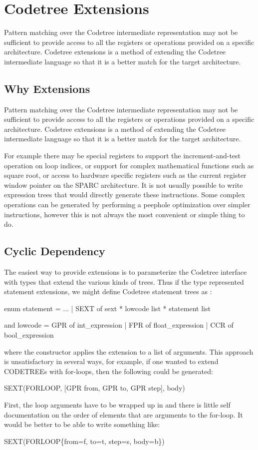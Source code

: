 \section{Codetree Extensions} \label{sec:codetree-extension}
	Pattern matching over the Codetree intermediate representation
may not be sufficient to provide access to all the registers or
operations provided on a specific architecture. Codetree extensions is a 
method of extending the Codetree intermediate language so that it is a
better match for the target architecture.


\subsection{Why Extensions}

	Pattern matching over the Codetree intermediate representation
may not be sufficient to provide access to all the registers or
operations provided on a specific architecture. Codetree extensions is a 
method of extending the Codetree intermediate language so that it is a
better match for the target architecture.

For example there may be special registers to support the
increment-and-test operation on loop indices, or 
support for complex mathematical functions such as
square root, or access to hardware specific registers such as the
current register window pointer on the SPARC architecture. It is not
usually possible to write expression trees that would directly
generate these instructions.
Some complex operations can be generated by performing a peephole
optimization over simpler instructions, however this is not always the 
most convenient or simple thing to do.

\subsection{Cyclic Dependency}

The easiest way to provide extensions is to parameterize the Codetree
interface with types that extend the various kinds of trees. Thus if
the type  represented statement extensions, we might define
Codetree statement trees as :
\begin{SML}
  enum statement
    = ...
    | SEXT of sext * lowcode list * statement list

  and lowcode = GPR of int_expression | FPR of float_expression | CCR of bool_expression
\end{SML}
where the constructor  applies the extension to a list of
arguments. This approach is unsatisfactory in several ways, for
example, if one wanted to extend CODETREEs with for-loops, then the
following could be generated:
\begin{SML}
  SEXT(FORLOOP, [GPR from, GPR to, GPR step], body)
\end{SML}	
First, the loop arguments have to be wrapped up in  and there
is little self documentation on the order of elements that are
arguments to the for-loop. It would be better to be able to write
something like:
\begin{SML}
  SEXT(FORLOOP\{from=f, to=t, step=s, body=b\}) 
\end{SML}

